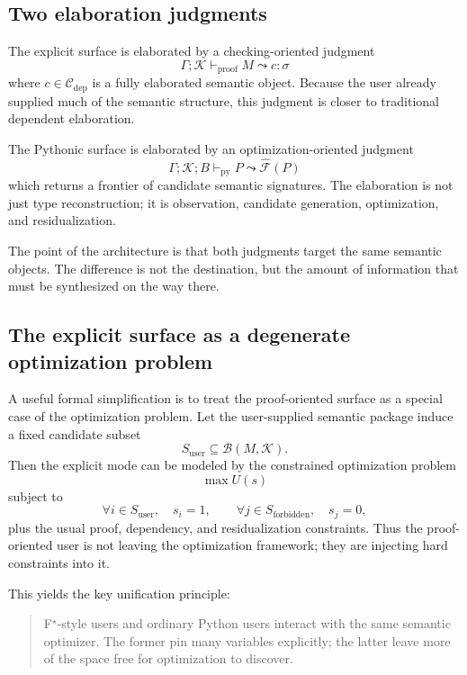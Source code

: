 \documentclass[11pt]{article}
\theoremstyle{definition}
\theoremstyle{plain}
\begin{document}
\subsection{Two elaboration judgments}
The explicit surface is elaborated by a checking-oriented judgment
\[
\Gamma ; \mathcal{K} \vdash_{\mathrm{proof}} M \leadsto c : \sigma
\]
where $c \in \mathcal{C}_{\mathrm{dep}}$ is a fully elaborated semantic object.
Because the user already supplied much of the semantic structure, this judgment
is closer to traditional dependent elaboration.

The Pythonic surface is elaborated by an optimization-oriented judgment
\[
\Gamma ; \mathcal{K} ; B \vdash_{\mathrm{py}} P \leadsto \widehat{\mathcal{F}}(P)
\]
which returns a frontier of candidate semantic signatures. The elaboration is not
just type reconstruction; it is observation, candidate generation, optimization,
and residualization.

The point of the architecture is that both judgments target the same semantic
objects. The difference is not the destination, but the amount of information
that must be synthesized on the way there.

\subsection{The explicit surface as a degenerate optimization problem}
A useful formal simplification is to treat the proof-oriented surface as a
special case of the optimization problem. Let the user-supplied semantic package
induce a fixed candidate subset
\[
S_{\mathrm{user}} \subseteq \mathcal{B}(M,\mathcal{K}).
\]
Then the explicit mode can be modeled by the constrained optimization problem
\[
\max U(s)
\]
subject to
\[
\forall i \in S_{\mathrm{user}}, \quad s_i = 1,
\qquad
\forall j \in S_{\mathrm{forbidden}}, \quad s_j = 0,
\]
plus the usual proof, dependency, and residualization constraints. Thus the
proof-oriented user is not leaving the optimization framework; they are injecting
hard constraints into it.

This yields the key unification principle:
\begin{quote}
F$^\star$-style users and ordinary Python users interact with the same semantic
optimizer. The former pin many variables explicitly; the latter leave more of the
space free for optimization to discover.
\end{quote}
\end{document}

